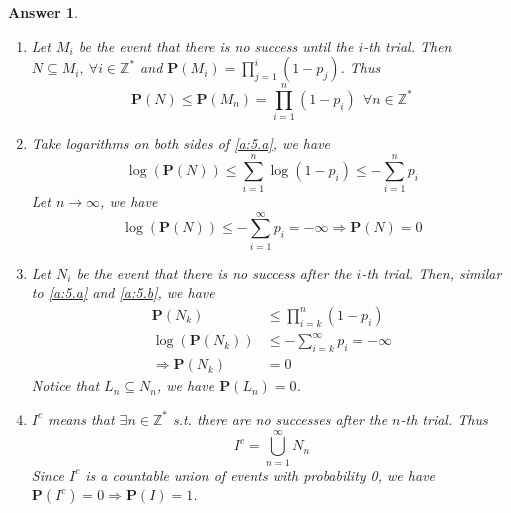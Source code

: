 \documentclass[utf8]{article}
\theoremstyle{definition}%
\theoremstyle{plain}%
\newtheorem{answer}{Answer} %
\begin{document}
\begin{answer} ~
    \begin{enumerate}[label=(\alph*)]
        \item \label{a:5.a} Let $M_i$ be the event that there is no success until the $i$-th trial. Then $N \subseteq M_i,~\forall i \in \mathbb{Z^*}$ and $\mathbf{P}(M_i) = \prod_{j=1}^i (1-p_j)$. Thus
        \begin{equation}
            \mathbf{P}(N) \leq \mathbf{P}(M_n) = \prod_{i=1}^n (1-p_i) ~~ \forall n \in \mathbb{Z^*}
        \end{equation}
        \item \label{a:5.b} Take logarithms on both sides of \ref{a:5.a}, we have
        \begin{equation}
            \log(\mathbf{P}(N)) \leq \sum_{i=1}^n \log(1-p_i) \leq -\sum_{i=1}^n p_i
        \end{equation}
        Let $ n \to \infty $, we have 
        \begin{equation}
            \log(\mathbf{P}(N)) \leq -\sum_{i=1}^\infty p_i = -\infty \Rightarrow \mathbf{P}(N) = 0
        \end{equation}
        \item Let $N_i$ be the event that there is no success after the $i$-th trial. Then, similar to \ref{a:5.a} and \ref{a:5.b}, we have
        \begin{equation}
        \begin{aligned}
            \mathbf{P}(N_k) &\leq \prod_{i=k}^n (1-p_i) \\
            \log(\mathbf{P}(N_k)) &\leq -\sum_{i=k}^\infty p_i = -\infty \\ 
            \Rightarrow \mathbf{P}(N_k) &= 0
        \end{aligned}
        \end{equation}
        Notice that $L_n \subseteq N_n$, we have $\mathbf{P}(L_n) = 0$.
        \item $I^c$ means that $\exists n \in \mathbb{Z^*}$ s.t. there are no successes after the $n$-th trial. Thus
        \begin{equation}
            I^c = \bigcup_{n=1}^\infty N_n
        \end{equation}
        Since $I^c$ is a countable union of events with probability 0, we have $\mathbf{P}(I^c) = 0 \Rightarrow \mathbf{P}(I) = 1$.
    \end{enumerate}
\end{answer}
\end{document}
